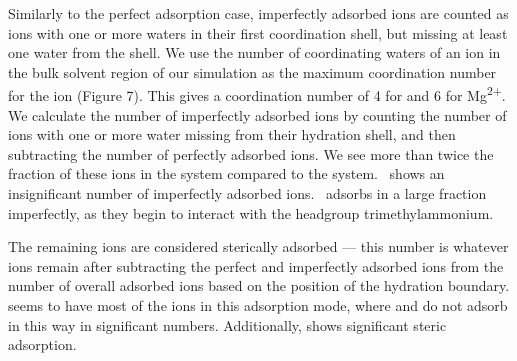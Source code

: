 Similarly to the perfect adsorption case, imperfectly adsorbed ions are counted as ions with one or more waters in their 
first coordination shell, but missing at least one
water from the shell. {We use the number of coordinating waters of an ion in the bulk solvent region
    of our simulation as the maximum coordination number for the ion (Figure 7). This
gives a coordination number of 4 for \li{} and 6 for 
Mg\textsuperscript{2+}.} We calculate 
{the number of imperfectly adsorbed ions} by counting the number of ions with 
one or more water missing from their hydration shell, and then subtracting the number of perfectly adsorbed ions.
We see more than twice the fraction of these ions in the \li{} system compared to the \na{} system.\ \mg{} shows an insignificant
number of imperfectly adsorbed ions.\ \cl{} adsorbs in a large fraction imperfectly, as they begin to interact with the headgroup trimethylammonium.

The remaining ions are considered sterically adsorbed --- this number is whatever ions remain after subtracting the 
perfect and imperfectly adsorbed ions from the number of overall adsorbed ions based on the position of the hydration boundary. 
\mg{} seems to have most of the ions in this adsorption mode, where \na{} and \li{} do not 
adsorb in this way in significant numbers. Additionally, \cl{} shows significant steric adsorption.


